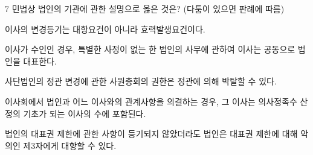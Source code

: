 \begin{question}{7}
민법상 법인의 기관에 관한 설명으로 옳은 것은? (다툼이 있으면 판례에 따름)
\begin{choices}
  \item 이사의 변경등기는 대항요건이 아니라 효력발생요건이다.
  \item 이사가 수인인 경우, 특별한 사정이 없는 한 법인의 사무에 관하여 이사는 공동으로 법인을 대표한다.
  \item 사단법인의 정관 변경에 관한 사원총회의 권한은 정관에 의해 박탈할 수 있다.
  \item 이사회에서 법인과 어느 이사와의 관계사항을 의결하는 경우, 그 이사는 의사정족수 산정의 기초가 되는 이사의 수에 포함된다.
  \item 법인의 대표권 제한에 관한 사항이 등기되지 않았더라도 법인은 대표권 제한에 대해 악의인 제3자에게 대항할 수 있다.
\end{choices}
\end{question}
